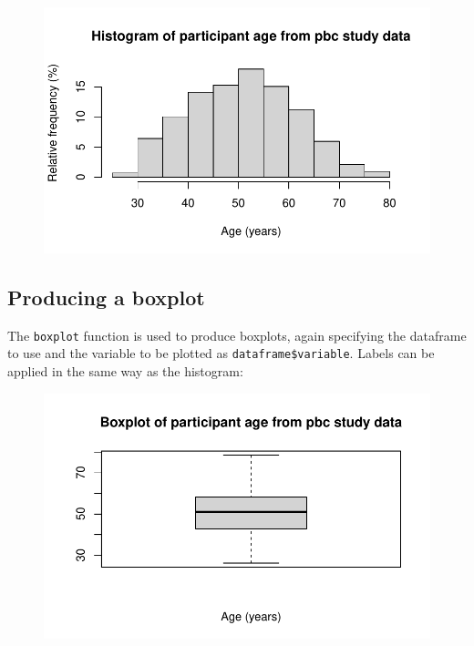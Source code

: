 \documentclass[
  a4paper,
]{memoir}
\newenvironment{Shaded}{\begin{snugshade}}{\end{snugshade}}
\newcommand{\AttributeTok}[1]{\textcolor[rgb]{0.00,0.00,0.00}{#1}}
\newcommand{\FunctionTok}[1]{\textcolor[rgb]{0.00,0.00,0.00}{#1}}
\newcommand{\NormalTok}[1]{\textcolor[rgb]{0.00,0.00,0.00}{#1}}
\newcommand{\SpecialCharTok}[1]{\textcolor[rgb]{0.00,0.00,0.00}{#1}}
\newcommand{\StringTok}[1]{\textcolor[rgb]{0.00,0.00,0.00}{#1}}
\begin{document}
\begin{figure}[H]

{\centering \includegraphics{01-intro_files/figure-pdf/unnamed-chunk-94-1.pdf}

}

\end{figure}

\hypertarget{producing-a-boxplot-1}{%
\subsection{Producing a boxplot}\label{producing-a-boxplot-1}}

The \texttt{boxplot} function is used to produce boxplots, again
specifying the dataframe to use and the variable to be plotted as
\texttt{dataframe\$variable}. Labels can be applied in the same way as
the histogram:

\begin{Shaded}
\end{Shaded}

\begin{figure}[H]

{\centering \includegraphics{01-intro_files/figure-pdf/unnamed-chunk-95-1.pdf}

}

\end{figure}
\end{document}
